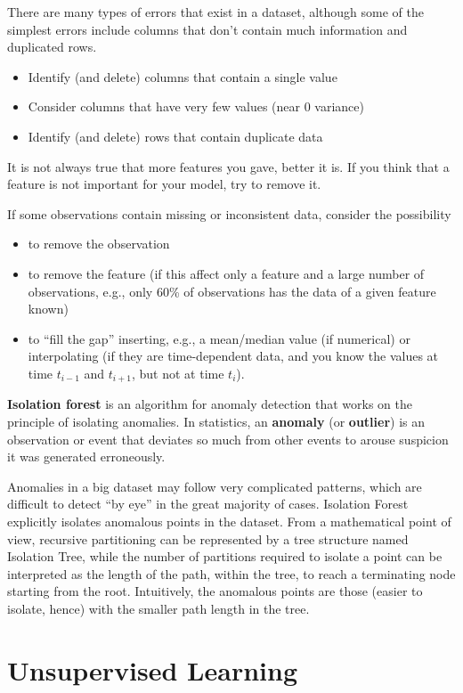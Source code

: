 There are many types of errors that exist in a dataset, although some of the simplest errors include columns that don’t contain much information and duplicated rows.
\begin{itemize}
    \item Identify (and delete) columns that contain a single value
    \item Consider columns that have very few values (near $0$ variance)
    \item Identify (and delete) rows that contain duplicate data
\end{itemize}

It is not always true that more features you gave, better it is. If you think that a feature is not important for your model, try to remove it.

If some observations contain missing or inconsistent data, consider the possibility
\begin{itemize}
    \item to remove the observation
    \item to remove the feature (if this affect only a feature and a large number of observations, e.g., only 60\% of observations has the data of a given feature known)
    \item to “fill the gap” inserting, e.g., a mean/median value (if numerical) or interpolating (if they are time-dependent data, and you know the values at time $t_{i-1}$ and $t_{i+1}$, but not at time $t_{i}$).
\end{itemize}

\textbf{Isolation forest} is an algorithm for anomaly detection that works on the principle of isolating anomalies. In statistics, an \textbf{anomaly} (or \textbf{outlier}) is an observation or event that deviates so much from other events to arouse suspicion it was generated erroneously.

Anomalies in a big dataset may follow very complicated patterns, which are difficult to detect “by eye” in the great majority of cases. Isolation Forest explicitly isolates anomalous points in the dataset. From a mathematical point of view, recursive partitioning can be represented by a tree structure named Isolation Tree, while the number of partitions required to isolate a point can be interpreted as the length of the path, within the tree, to reach a terminating node starting from the root. Intuitively, the anomalous points are those (easier to isolate, hence) with the smaller path length in the tree.

\section{Unsupervised Learning}

